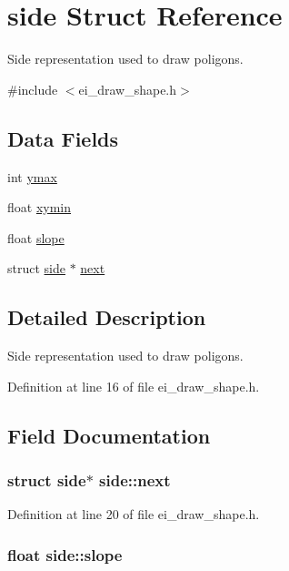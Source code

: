 \hypertarget{structside}{\section{side Struct Reference}
\label{structside}
}


Side representation used to draw poligons.  




{\ttfamily \#include $<$ei\-\_\-draw\-\_\-shape.\-h$>$}

\subsection*{Data Fields}
\begin{DoxyCompactItemize}
\item 
int \hyperlink{structside_a8398a358cdcf0548f0c49e98cbf2075a}{ymax}
\item 
float \hyperlink{structside_a3cd67c5f19d85e6cd3f327a058e47478}{xymin}
\item 
float \hyperlink{structside_af62a04a3173e195ecee5ad2f7196b759}{slope}
\item 
struct \hyperlink{structside}{side} $\ast$ \hyperlink{structside_a682784f9e9058480389a869b86b94213}{next}
\end{DoxyCompactItemize}


\subsection{Detailed Description}
Side representation used to draw poligons. 

Definition at line 16 of file ei\-\_\-draw\-\_\-shape.\-h.



\subsection{Field Documentation}
\hypertarget{structside_a682784f9e9058480389a869b86b94213}{
\subsubsection[{next}]{\setlength{\rightskip}{0pt plus 5cm}struct {\bf side}$\ast$ side\-::next}}\label{structside_a682784f9e9058480389a869b86b94213}


Definition at line 20 of file ei\-\_\-draw\-\_\-shape.\-h.

\hypertarget{structside_af62a04a3173e195ecee5ad2f7196b759}{
\subsubsection[{slope}]{\setlength{\rightskip}{0pt plus 5cm}float side\-::slope}}\label{structside_af62a04a3173e195ecee5ad2f7196b759}


